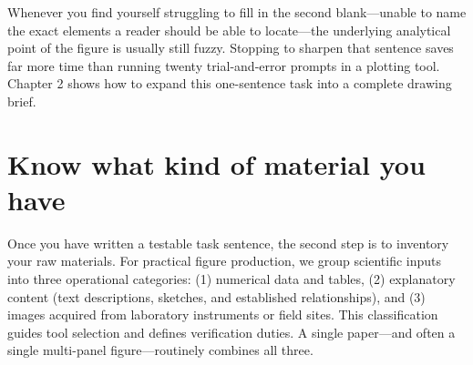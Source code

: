 Whenever you find yourself struggling to fill in the second blank---unable to name the exact elements a reader should be able to locate---the underlying analytical point of the figure is usually still fuzzy. Stopping to sharpen that sentence saves far more time than running twenty trial-and-error prompts in a plotting tool. Chapter 2 shows how to expand this one-sentence task into a complete drawing brief.

\section{Know what kind of material you have}

Once you have written a testable task sentence, the second step is to inventory your raw materials. For practical figure production, we group scientific inputs into three operational categories: (1) numerical data and tables, (2) explanatory content (text descriptions, sketches, and established relationships), and (3) images acquired from laboratory instruments or field sites. This classification guides tool selection and defines verification duties. A single paper---and often a single multi-panel figure---routinely combines all three.

